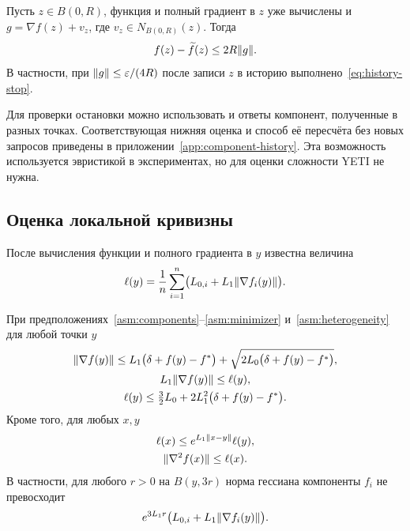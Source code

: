\begin{lemma}
\label{lem:history-small-gradient}
Пусть $z\in B(0,R)$, функция и полный градиент в $z$ уже вычислены и
$g=\nabla f(z)+v_z$, где $v_z\in N_{B(0,R)}(z)$. Тогда
\[
 f(z)-\widetilde f(z)\le2R\lVert g\rVert.
\]
В частности, при $\lVert g\rVert\le\varepsilon/(4R)$ после записи $z$
в историю выполнено~\eqref{eq:history-stop}.
\end{lemma}

Для проверки остановки можно использовать и ответы компонент,
полученные в разных точках. Соответствующая нижняя оценка и способ её
пересчёта без новых запросов приведены в
приложении~\ref{app:component-history}. Эта возможность используется
эвристикой в экспериментах, но для оценки сложности YETI не нужна.

\subsection{Оценка локальной кривизны}

После вычисления функции и полного градиента в $y$ известна величина
\begin{equation}\label{eq:observed-curvature}
 \ell(y)=\frac1n\sum_{i=1}^n
       \bigl(L_{0,i}+L_1\lVert\nabla f_i(y)\rVert\bigr).
\end{equation}
\begin{lemma}\label{lem:observed-curvature}
При предположениях~\ref{asm:components}--\ref{asm:minimizer}
и~\ref{asm:heterogeneity} для любой точки $y$
\begin{equation}\label{eq:curvature-gap}
 \begin{gathered}
 \lVert\nabla f(y)\rVert
 \le L_1\bigl(\delta+f(y)-f^\ast\bigr)
 +\sqrt{2L_0\bigl(\delta+f(y)-f^\ast\bigr)},\\
 L_1\lVert\nabla f(y)\rVert\le\ell(y),\\
 \ell(y)\le\tfrac32L_0+2L_1^2\bigl(\delta+f(y)-f^\ast\bigr).
 \end{gathered}
\end{equation}
Кроме того, для любых $x,y$
\begin{equation}\label{eq:curvature-transfer}
 \begin{gathered}
 \ell(x)\le e^{L_1\lVert x-y\rVert}\ell(y),\\
 \lVert\nabla^2f(x)\rVert\le\ell(x).
 \end{gathered}
\end{equation}
В частности, для любого $r>0$ на $B(y,3r)$ норма гессиана компоненты $f_i$
не превосходит
\begin{equation}\label{eq:component-local-smoothness}
 e^{3L_1r}\bigl(L_{0,i}+L_1\lVert\nabla f_i(y)\rVert\bigr).
\end{equation}
\end{lemma}

